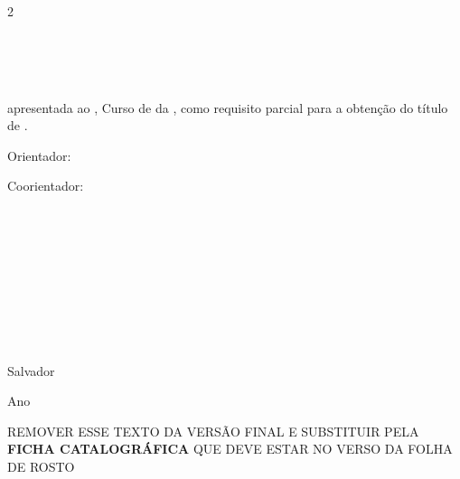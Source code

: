 \begin{folharosto}

\begin{center}
\theauthor
\end{center}
\ \\
\ \\

\begin{spacing}{2}
   \begin{center}
   {\LARGE {\bf \thetitle}}
   \end{center}
\end{spacing}
\ \\
\ \\
\ \\
\begin{flushright}

   \begin{list}{}{
      \setlength{\leftmargin}{4.5cm}
      \setlength{\rightmargin}{0cm}
      \setlength{\labelwidth}{0pt}
      \setlength{\labelsep}{\leftmargin}}

      \item \thetypework apresentada ao \thefaculty, Curso de \thecourse da \theuniversity, como requisito parcial para a obten\c{c}\~ao do t\'itulo de {\bf \thedegreetitle}.

      \begin{list}{}{
      \setlength{\leftmargin}{0cm}
      \setlength{\rightmargin}{0cm}
      \setlength{\labelwidth}{0pt}
      \setlength{\labelsep}{\leftmargin}}


      \item Orientador: \theadvisor
      \item Coorientador: \thecoadvisor
      \newline \hspace*{2.1cm}  {\it %
      }


      \end{list}
   \end{list}

\end{flushright}
\ \\
\ \\
\ \\
\ \\
\ \\
\ \\
\ \\
\ \\
   \begin{center}
   Salvador \par
   Ano
   \end{center}

\newpage
\thispagestyle{empty}
\centering
REMOVER ESSE TEXTO DA VERSÃO FINAL E SUBSTITUIR PELA \textbf{FICHA CATALOGRÁFICA} QUE DEVE ESTAR NO VERSO DA FOLHA DE ROSTO\\

\end{folharosto}
